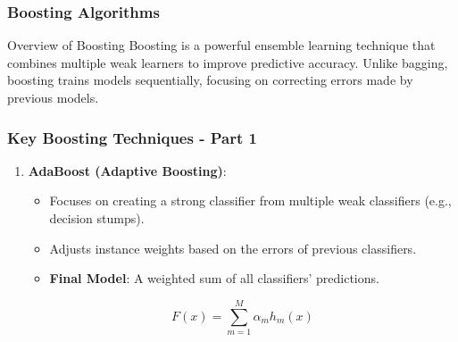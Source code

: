 \documentclass[aspectratio=169]{beamer}
\begin{document}
\begin{frame}[fragile]
    \frametitle{Boosting Algorithms}
    \begin{block}{Overview of Boosting}
        Boosting is a powerful ensemble learning technique that combines multiple weak learners to improve predictive accuracy. Unlike bagging, boosting trains models sequentially, focusing on correcting errors made by previous models.
    \end{block}
\end{frame}

\begin{frame}[fragile]
    \frametitle{Key Boosting Techniques - Part 1}
    \begin{enumerate}
        \item \textbf{AdaBoost (Adaptive Boosting)}:
        \begin{itemize}
            \item Focuses on creating a strong classifier from multiple weak classifiers (e.g., decision stumps).
            \item Adjusts instance weights based on the errors of previous classifiers.
            \item \textbf{Final Model}: A weighted sum of all classifiers' predictions.
        \end{itemize}
        \begin{equation}
            F(x) = \sum_{m=1}^{M} \alpha_m h_m(x)
        \end{equation}
    \end{enumerate}
\end{frame}
\end{document}
